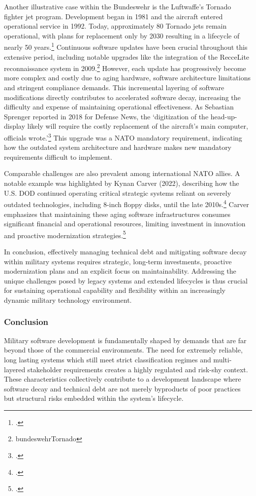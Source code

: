 Another illustrative case within the Bundeswehr is the Luftwaffe's Tornado fighter jet program. Development began in 1981 and the aircraft entered operational service in 1992. Today, approximately 80 Tornado jets remain operational, with plans for 
replacement only by 2030 resulting in a lifecycle of nearly 50 years.\footcite{skibaTornado50Jahre2024} Continuous software updates have been crucial throughout this extensive period, including notable upgrades like the integration of the RecceLite reconnaissance system in 2009.\footnote{bundeswehrTornado} However, 
each update has progressively become more complex and costly due to aging hardware, software architecture limitations and stringent compliance demands. This incremental layering of software modifications directly contributes to accelerated software decay, increasing the difficulty and expense of maintaining operational effectiveness.
As Sebastian Sprenger reported in 2018 for Defense News, the `digitization of the head-up-display likely will require the costly replacement of the aircraft’s main computer, officials wrote.'\footcite{sprengerGermanyFearsSteeper2018} This upgrade was a NATO mandatory requirement, indicating how the outdated system architecture and hardware makes new mandatory requirements difficult to implement. 

Comparable challenges are also prevalent among international NATO allies. A notable example was highlighted by Kynan Carver (2022), describing how the U.S. \ac{DOD} continued operating critical strategic systems reliant on severely outdated technologies, 
including 8-inch floppy disks, until the late 2010s.\footcite{carverTechnicalDebtCybersecurity2022} Carver emphasizes that maintaining these aging software infrastructures consumes significant financial and operational resources, limiting investment in innovation and proactive modernization strategies.\footcite{carverTechnicalDebtCybersecurity2022}

In conclusion, effectively managing technical debt and mitigating software decay within military systems requires strategic, long-term investments, proactive modernization plans and an explicit focus on maintainability. Addressing the unique challenges posed by legacy 
systems and extended lifecycles is thus crucial for sustaining operational capability and flexibility within an increasingly dynamic military technology environment.

\subsubsection{Conclusion}
Military software development is fundamentally shaped by demands that are far beyond those of the commercial environments. The need for extremely reliable, long lasting systems which still meet strict classification regimes and multi-layered stakeholder requirements creates a highly regulated and risk-shy context.
These characteristics collectively contribute to a development landscape where software decay and technical debt are not merely byproducts of poor practices but structural risks embedded within the system's lifecycle.\\

